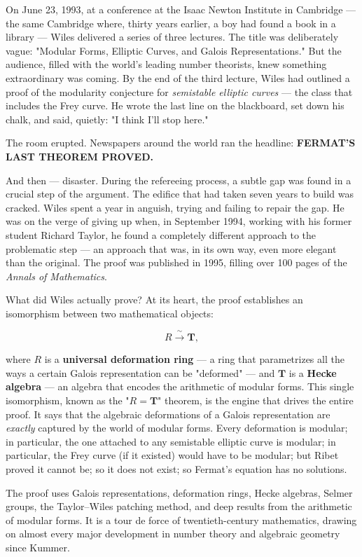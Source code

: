 \documentclass[12pt, letterpaper, openany]{book}
\theoremstyle{definition}
\theoremstyle{remark}
\begin{document}
On June 23, 1993, at a conference at the Isaac Newton Institute in Cambridge --- the same Cambridge where, thirty years earlier, a boy had found a book in a library --- Wiles delivered a series of three lectures. The title was deliberately vague: "Modular Forms, Elliptic Curves, and Galois Representations." But the audience, filled with the world's leading number theorists, knew something extraordinary was coming. By the end of the third lecture, Wiles had outlined a proof of the modularity conjecture for \textit{semistable elliptic curves} --- the class that includes the Frey curve. He wrote the last line on the blackboard, set down his chalk, and said, quietly: "I think I'll stop here."

The room erupted. Newspapers around the world ran the headline: \textbf{FERMAT'S LAST THEOREM PROVED.}

And then --- disaster. During the refereeing process, a subtle gap was found in a crucial step of the argument. The edifice that had taken seven years to build was cracked. Wiles spent a year in anguish, trying and failing to repair the gap. He was on the verge of giving up when, in September 1994, working with his former student Richard Taylor, he found a completely different approach to the problematic step --- an approach that was, in its own way, even more elegant than the original. The proof was published in 1995, filling over 100 pages of the \textit{Annals of Mathematics}.

What did Wiles actually prove? At its heart, the proof establishes an isomorphism between two mathematical objects:

\[
R \xrightarrow{\;\sim\;} \mathbf{T},
\]

where $R$ is a \textbf{universal deformation ring} --- a ring that parametrizes all the ways a certain Galois representation can be "deformed" --- and $\mathbf{T}$ is a \textbf{Hecke algebra} --- an algebra that encodes the arithmetic of modular forms. This single isomorphism, known as the "$R = \mathbf{T}$" theorem, is the engine that drives the entire proof. It says that the algebraic deformations of a Galois representation are \textit{exactly} captured by the world of modular forms. Every deformation is modular; in particular, the one attached to any semistable elliptic curve is modular; in particular, the Frey curve (if it existed) would have to be modular; but Ribet proved it cannot be; so it does not exist; so Fermat's equation has no solutions.

The proof uses Galois representations, deformation rings, Hecke algebras, Selmer groups, the Taylor--Wiles patching method, and deep results from the arithmetic of modular forms. It is a tour de force of twentieth-century mathematics, drawing on almost every major development in number theory and algebraic geometry since Kummer.
\end{document}
